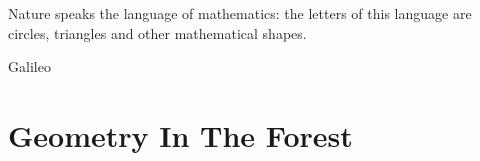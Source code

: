 

\cleardoublepage
\vspace*{\fill}
\begin{center}
\epigraph{\begin{minipage}{0.4\pagewidth} \textsf{Nature speaks the language of mathematics: the letters of this language are circles, triangles and other mathematical shapes.}\end{minipage}}{Galileo}
\end{center}
\vspace*{\fill}

\thispagestyle{empty}


\cleardoublepage

%


\chapter{Geometry In The Forest}
\label{ch-01}


